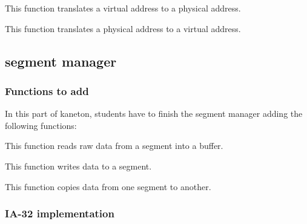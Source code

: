 This function translates a virtual address to a physical address.


This function translates a physical address to a virtual address.

\subsection{segment manager}

\subsubsection{Functions to add}

In this part  of kaneton, students have to  finish the segment manager
adding the following functions:


This function reads raw data from a segment into a buffer.


This function writes data to a segment.


This function copies data from one segment to another.

\subsubsection{IA-32 implementation}

